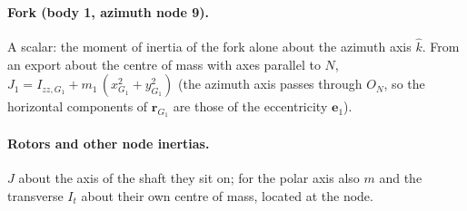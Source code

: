 \documentclass[10pt,a4paper]{article}
\numberwithin{equation}{section}
\begin{document}
\paragraph{Fork (body 1, azimuth node 9).} A scalar: the moment of inertia of the fork alone about the azimuth axis $\hat k$. From an export about the centre of mass with axes parallel to $N$, $J_1 = I_{zz,G_1} + m_1\,(x_{G_1}^2 + y_{G_1}^2)$ (the azimuth axis passes through $O_N$, so the horizontal components of $\mathbf r_{G_1}$ are those of the eccentricity $\mathbf e_1$).
\paragraph{Rotors and other node inertias.} $J$ about the axis of the shaft they sit on; for the polar axis also $m$ and the transverse $I_t$ about their own centre of mass, located at the node.
\end{document}
